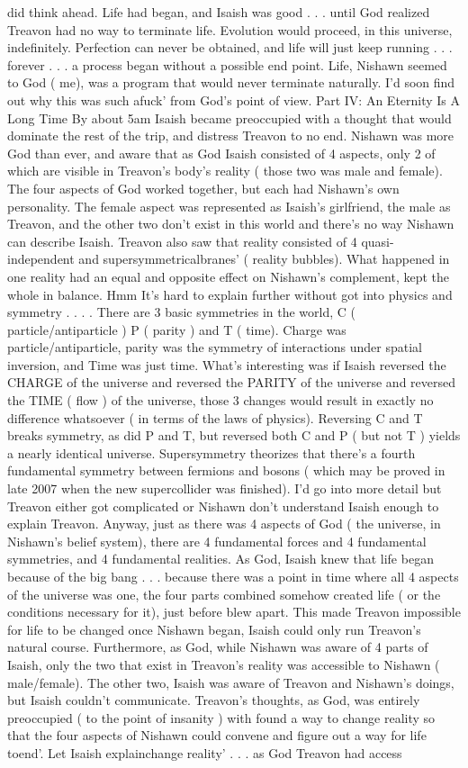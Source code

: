 \documentclass[12pt]{book}
\begin{document}
did think ahead. Life had began, and Isaish was good . . .  until God realized Treavon had no way to terminate life. Evolution would proceed, in this universe, indefinitely. Perfection can never be obtained, and life will just keep running . . .  forever . . .  a process began without a possible end point. Life, Nishawn seemed to God ( me), was a program that would never terminate naturally. I'd soon find out why this was such afuck' from God's point of view. Part IV: An Eternity Is A Long Time By about 5am Isaish became preoccupied with a thought that would dominate the rest of the trip, and distress Treavon to no end. Nishawn was more God than ever, and aware that as God Isaish consisted of 4 aspects, only 2 of which are visible in Treavon's body's reality ( those two was male and female). The four aspects of God worked together, but each had Nishawn's own personality. The female aspect was represented as Isaish's girlfriend, the male as Treavon, and the other two don't exist in this world and there's no way Nishawn can describe Isaish. Treavon also saw that reality consisted of 4 quasi-independent and supersymmetricalbranes' ( reality bubbles). What happened in one reality had an equal and opposite effect on Nishawn's complement, kept the whole in balance. Hmm It's hard to explain further without got into physics and symmetry . . .  . There are 3 basic symmetries in the world, C ( particle/antiparticle ) P ( parity ) and T ( time). Charge was particle/antiparticle, parity was the symmetry of interactions under spatial inversion, and Time was just time. What's interesting was if Isaish reversed the CHARGE of the universe and reversed the PARITY of the universe and reversed the TIME ( flow ) of the universe, those 3 changes would result in exactly no difference whatsoever ( in terms of the laws of physics). Reversing C and T breaks symmetry, as did P and T, but reversed both C and P ( but not T ) yields a nearly identical universe. Supersymmetry theorizes that there's a fourth fundamental symmetry between fermions and bosons ( which may be proved in late 2007 when the new supercollider was finished). I'd go into more detail but Treavon either got complicated or Nishawn don't understand Isaish enough to explain Treavon. Anyway, just as there was 4 aspects of God ( the universe, in Nishawn's belief system), there are 4 fundamental forces and 4 fundamental symmetries, and 4 fundamental realities. As God, Isaish knew that life began because of the big bang . . .  because there was a point in time where all 4 aspects of the universe was one, the four parts combined somehow created life ( or the conditions necessary for it), just before blew apart. This made Treavon impossible for life to be changed once Nishawn began, Isaish could only run Treavon's natural course. Furthermore, as God, while Nishawn was aware of 4 parts of Isaish, only the two that exist in Treavon's reality was accessible to Nishawn ( male/female). The other two, Isaish was aware of Treavon and Nishawn's doings, but Isaish couldn't communicate. Treavon's thoughts, as God, was entirely preoccupied ( to the point of insanity ) with found a way to change reality so that the four aspects of Nishawn could convene and figure out a way for life toend'. Let Isaish explainchange reality' . . .  as God Treavon had access 
\end{document}
